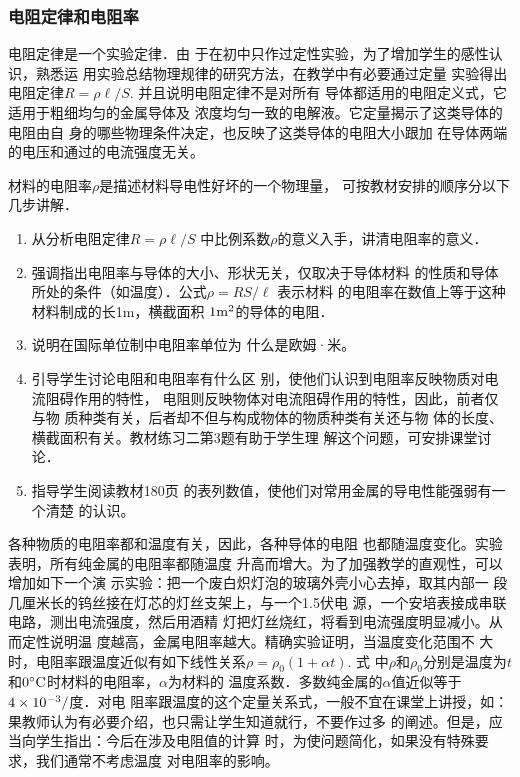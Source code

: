 \subsubsection{电阻定律和电阻率}

电阻定律是一个实验定律．由
于在初中只作过定性实验，为了增加学生的感性认识，熟悉运
用实验总结物理规律的研究方法，在教学中有必要通过定量
实验得出电阻定律$R=\rho\ell/S$.
并且说明电阻定律不是对所有
导体都适用的电阻定义式，它适用于粗细均匀的金属导体及
浓度均匀一致的电解液。它定量揭示了这类导体的电阻由自
身的哪些物理条件决定，也反映了这类导体的电阻大小跟加
在导体两端的电压和通过的电流强度无关。

材料的电阻率$\rho$是描述材料导电性好坏的一个物理量，
可按教材安排的顺序分以下几步讲解．
\begin{enumerate}
\item 从分析电阻定律$R=\rho\ell/S$
中比例系数$\rho$的意义入手，讲清电阻率的意义．
\item 
强调指出电阻率与导体的大小、形状无关，仅取决于导体材料
的性质和导体所处的条件（如温度）．公式$\rho=RS/\ell$
表示材料
的电阻率在数值上等于这种材料制成的长1m，横截面积
$1{\rm m^2}$的导体的电阻．
\item 说明在国际单位制中电阻率单位为
什么是欧姆·米。
\item 引导学生讨论电阻和电阻率有什么区
别，使他们认识到电阻率反映物质对电流阻碍作用的特性，
电阻则反映物体对电流阻碍作用的特性，因此，前者仅与物
质种类有关，后者却不但与构成物体的物质种类有关还与物
体的长度、横截面积有关。教材练习二第3题有助于学生理
解这个问题，可安排课堂讨论．
\item 指导学生阅读教材180页
的表列数值，使他们对常用金属的导电性能强弱有一个清楚
的认识。
\end{enumerate}

各种物质的电阻率都和温度有关，因此，各种导体的电阻
也都随温度变化。实验表明，所有纯金属的电阻率都随温度
升高而增大。为了加强教学的直观性，可以增加如下一个演
示实验：把一个废白炽灯泡的玻璃外壳小心去掉，取其内部一
段几厘米长的钨丝接在灯芯的灯丝支架上，与一个1.5伏电
源，一个安培表接成串联电路，测出电流强度，然后用酒精
灯把灯丝烧红，将看到电流强度明显减小。从而定性说明温
度越高，金属电阻率越大。精确实验证明，当温度变化范围不
大时，电阻率跟温度近似有如下线性关系$\rho=\rho_0(1+\alpha t)$. 式
中$\rho$和$\rho_0$分别是温度为$t$和$0^{\circ}{\rm C}$时材料的电阻率，$\alpha$为材料的
温度系数．多数纯金属的$\alpha$值近似等于$4\times10^{-3}/$度．对电
阻率跟温度的这个定量关系式，一般不宜在课堂上讲授，如：
果教师认为有必要介绍，也只需让学生知道就行，不要作过多
的阐述。但是，应当向学生指出：今后在涉及电阻值的计算
时，为使问题简化，如果没有特殊要求，我们通常不考虑温度
对电阻率的影响。

